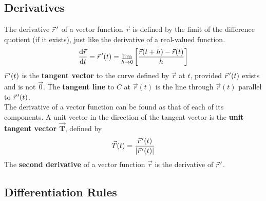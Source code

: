 \documentclass[../Calculus_\Roman{3}]{subfiles}
\begin{document}
		\subsection*{Derivatives}
				The derivative $\vec{r}\hspace{0.5mm}'$ of a vector function $\vec{r}$ is defined by the limit of the difference quotient (if it exists), just like the derivative of a real-valued function.
					\[\frac{\mathrm{d} \vec{r}}{\mathrm{d} t} = \vec{r}\hspace{0.5mm}'(t) = \lim_{h\to 0}\left[\frac{\vec{r}(t + h) - \vec{r}(t)}{h}\right]\]
				$\vec{r}\hspace{0.5mm}'(t)$ is the \textbf{tangent vector} to the curve defined by $\vec{r}$ at $t$, provided $\vec{r}\hspace{0.5mm}'(t)$ exists and is not $\vec{0}$. The \textbf{tangent line} to $C$ at $\vec{r}(t)$ is the line through $\vec{r}(t)$ parallel to $\vec{r}\hspace{0.5mm}'(t)$. \\
				The derivative of a vector function can be found as that of each of its components.
				A unit vector in the direction of the tangent vector is the \textbf{unit tangent vector $\bm{\vec{T}}$}, defined by
					\[\vec{T}(t) = \frac{\vec{r}\hspace{0.5mm}'(t)}{|\vec{r}\hspace{0.5mm}'(t)|}\]
				The \textbf{second derivative} of a vector function $\vec{r}$ is the derivative of $\vec{r}\hspace{0.5mm}'$.
			\subsection*{Differentiation Rules}
\end{document}

